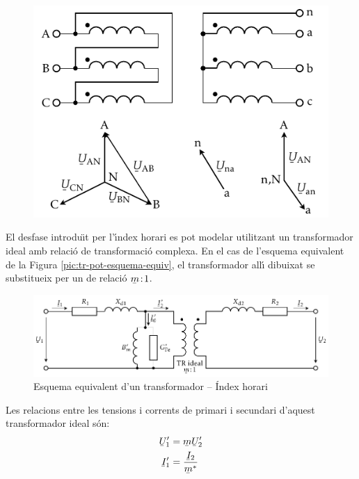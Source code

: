 \begin{exemple}
    \begin{figure}[!h]
    \centering
        \includegraphics{Imatges/Cap-TrafosPot-Exemple-Dy.pdf}
    \end{figure}
\end{exemple}

El desfase introdu\"{\i}t per l'\'{\i}ndex horari es pot modelar utilitzant  un transformador ideal amb relaci\'{o} de transformaci\'{o} complexa. En el cas de l'esquema equivalent de la Figura  \vref{pic:tr-pot-esquema-equiv}, el transformador all\'{\i} dibuixat
se substitueix per un de relaci\'{o} $\cmplx{m}\!:\!1$.

\begin{figure}[htb]
\centering
    \includegraphics{Imatges/Cap-TrafosPot-Esq-Equiv-Complex.pdf}
\caption{Esquema equivalent d'un transformador -- \'{I}ndex horari}
\end{figure}

Les relacions entre les tensions i corrents de primari i secundari d'aquest transformador ideal s\'{o}n:
\begin{subequations}
\begin{align}
    \cmplx{U}'_1 &= \cmplx{m}\cmplx{U}'_2\\  \cmplx{I}'_1 &= \frac{\cmplx{I}_2}{\cmplx{m}^*}
\end{align}
\end{subequations}

